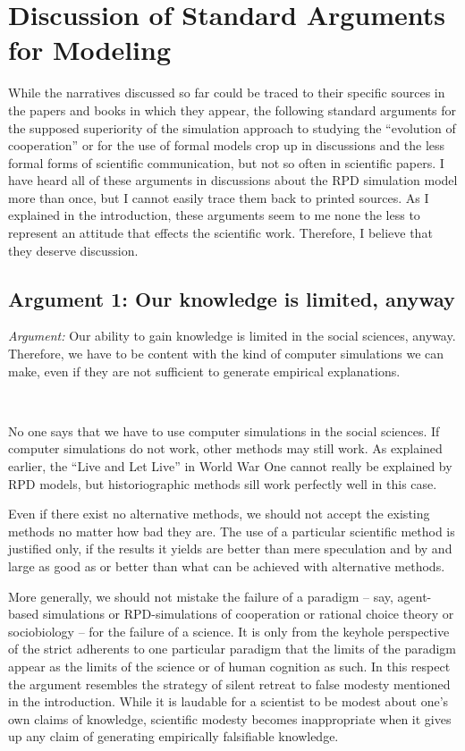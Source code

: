 \documentclass[graybox, English]{svmult}
\begin{document}
\section{Discussion of Standard Arguments for Modeling}

While the narratives discussed so far could be traced to their specific
sources in the papers and books in which they appear, the following
standard arguments for the supposed superiority of the simulation
approach to studying the ``evolution of cooperation'' or for the use
of formal models crop up in discussions and the less formal forms of
scientific communication, but not so often in scientific papers. I
have heard all of these arguments in discussions about the RPD
simulation model more than once, but I cannot easily trace them back
to printed sources. As I explained in the introduction, these arguments
seem to me none the less to represent an attitude that effects the
scientific work. Therefore, I believe that they deserve discussion.

\subsection{Argument 1: Our knowledge is limited, anyway}

{\em Argument:} Our ability to gain knowledge is limited in the social
sciences, anyway. Therefore, we have to be content with the kind of
computer simulations we can make, even if they are not sufficient to
generate empirical explanations.

\

 No one says that we have to use computer simulations
in the social sciences. If computer simulations do not work, other
methods may still work. As explained earlier, the ``Live and Let Live''
in World War One cannot really be explained by RPD models, but
historiographic methods sill work perfectly well in this
case. 

Even if there exist no alternative methods, we should not accept the
existing methods no matter how bad they are. The use of a particular
scientific method is justified only, if the results it yields are
better than mere speculation and by and large as good as or better
than what can be achieved with alternative methods.

More generally, we should not mistake the failure of a paradigm -- say,
agent-based simulations or RPD-simulations of cooperation or rational
choice theory or sociobiology -- for the failure of a science. It is
only from the keyhole perspective of the strict adherents to one
particular paradigm that the limits of the paradigm appear as the
limits of the science or of human cognition as such. In this respect
the argument resembles the strategy of silent retreat to false
modesty mentioned in the introduction. While it is laudable for a
scientist to be modest about one's own claims of knowledge, scientific
modesty becomes inappropriate when it gives up any claim of generating
empirically falsifiable knowledge.
\end{document}
